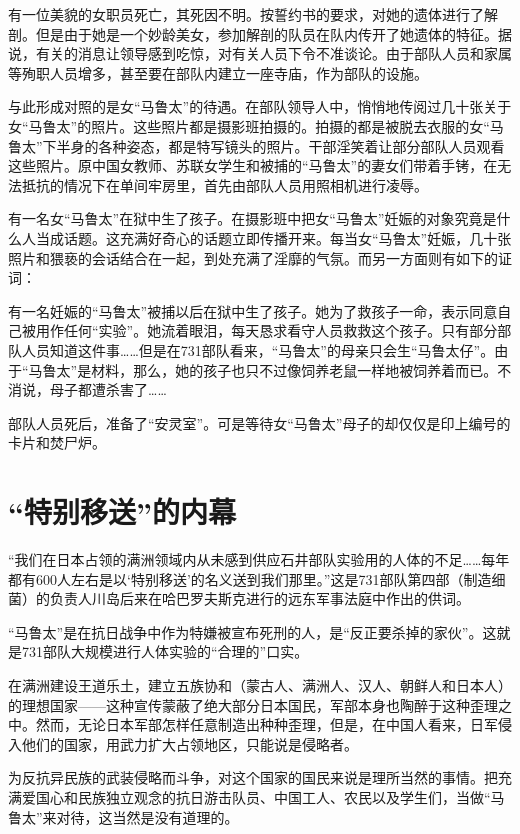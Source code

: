 \documentclass[a4paper,12pt,UTF8,twoside]{ctexbook}
\begin{document}
有一位美貌的女职员死亡，其死因不明。按誓约书的要求，对她的遗体进行了解剖。但是由于她是一个妙龄美女，参加解剖的队员在队内传开了她遗体的特征。据说，有关的消息让领导感到吃惊，对有关人员下令不准谈论。由于部队人员和家属等殉职人员增多，甚至要在部队内建立一座寺庙，作为部队的设施。

与此形成对照的是女“马鲁太”的待遇。在部队领导人中，悄悄地传阅过几十张关于女“马鲁太”的照片。这些照片都是摄影班拍摄的。拍摄的都是被脱去衣服的女“马鲁太”下半身的各种姿态，都是特写镜头的照片。干部淫笑着让部分部队人员观看这些照片。原中国女教师、苏联女学生和被捕的“马鲁太”的妻女们带着手铐，在无法抵抗的情况下在单间牢房里，首先由部队人员用照相机进行凌辱。

有一名女“马鲁太”在狱中生了孩子。在摄影班中把女“马鲁太”妊娠的对象究竟是什么人当成话题。这充满好奇心的话题立即传播开来。每当女“马鲁太”妊娠，几十张照片和猥亵的会话结合在一起，到处充满了淫靡的气氛。而另一方面则有如下的证词：

有一名妊娠的“马鲁太”被捕以后在狱中生了孩子。她为了救孩子一命，表示同意自己被用作任何“实验”。她流着眼泪，每天恳求看守人员救救这个孩子。只有部分部队人员知道这件事……但是在731部队看来，“马鲁太”的母亲只会生“马鲁太仔”。由于“马鲁太”是材料，那么，她的孩子也只不过像饲养老鼠一样地被饲养着而已。不消说，母子都遭杀害了……

部队人员死后，准备了“安灵室”。可是等待女“马鲁太”母子的却仅仅是印上编号的卡片和焚尸炉。

\section{“特别移送”的内幕}

“我们在日本占领的满洲领域内从未感到供应石井部队实验用的人体的不足……每年都有600人左右是以‘特别移送’的名义送到我们那里。”这是731部队第四部（制造细菌）的负责人川岛后来在哈巴罗夫斯克进行的远东军事法庭中作出的供词。

“马鲁太”是在抗日战争中作为特嫌被宣布死刑的人，是“反正要杀掉的家伙”。这就是731部队大规模进行人体实验的“合理的”口实。

在满洲建设王道乐土，建立五族协和（蒙古人、满洲人、汉人、朝鲜人和日本人）的理想国家——这种宣传蒙蔽了绝大部分日本国民，军部本身也陶醉于这种歪理之中。然而，无论日本军部怎样任意制造出种种歪理，但是，在中国人看来，日军侵入他们的国家，用武力扩大占领地区，只能说是侵略者。

为反抗异民族的武装侵略而斗争，对这个国家的国民来说是理所当然的事情。把充满爱国心和民族独立观念的抗日游击队员、中国工人、农民以及学生们，当做“马鲁太”来对待，这当然是没有道理的。
\end{document}
